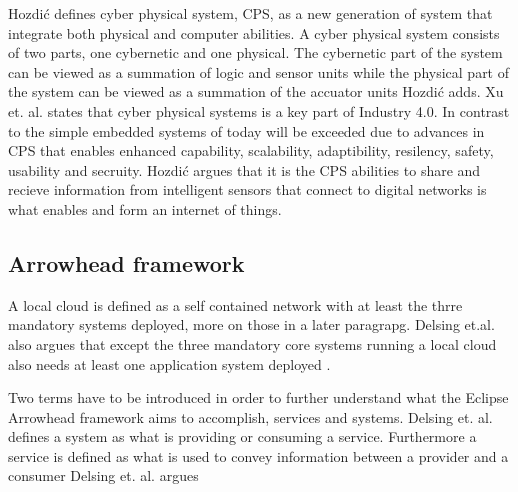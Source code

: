 Hozdić defines cyber physical system, CPS, as a new generation of system that integrate both physical and computer abilities. \cite{Hozdic2015}
A cyber physical system consists of two parts, one cybernetic and one physical.
The cybernetic part of the system can be viewed as a summation of logic and sensor units while the physical part of the system can be viewed as a summation of the accuator units Hozdić adds. \cite{Hozdic2015}
Xu et. al. states that cyber physical systems is a key part of Industry 4.0. In contrast to the simple embedded systems of today will be exceeded due to advances in CPS that enables enhanced capability, scalability, adaptibility, resilency, safety, usability and secruity.  \cite{Xu2018}
Hozdić argues that it is the CPS abilities to share and recieve information from intelligent sensors that connect to digital networks is what enables and form an internet of things. \cite{Hozdic2015}
 

\subsection{Arrowhead framework}
A local cloud is defined as a self contained network with at least the thrre mandatory systems deployed, more on those in a later paragrapg. 
Delsing et.al. also argues that except the three mandatory core systems running a local cloud also needs at least one application system deployed \cite{Delsing2017}.

Two terms have to be introduced in order to further understand what the Eclipse Arrowhead framework aims to accomplish, services and systems.
Delsing et. al. defines a system as what is providing or consuming a service. \cite{Delsing2017} 
Furthermore a service is defined as what is used to convey information between a provider and a consumer Delsing et. al. argues \cite{Delsing2017}

